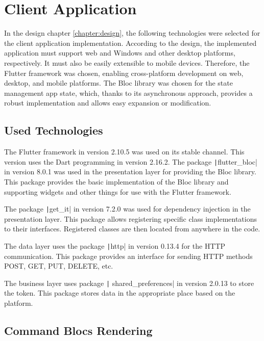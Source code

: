 \section{Client Application}

In the design chapter \ref{chapter:design}, the following technologies were selected for the client application implementation.
According to the design, the implemented application must support web and Windows and other desktop platforms, respectively.
It must also be easily extensible to mobile devices.
Therefore, the Flutter framework was chosen, enabling cross-platform development on web, desktop, and mobile platforms.
The Bloc library was chosen for the state management app state, which, thanks to its asynchronous approach, provides a robust implementation and allows easy expansion or modification.

\subsection{Used Technologies}

The Flutter framework in version 2.10.5 was used on its stable channel.
This version uses the Dart programming in version 2.16.2.
The package \texttt|flutter_bloc| in version 8.0.1 was used in the presentation layer for providing the Bloc library.
This package provides the basic implementation of the Bloc library and supporting widgets and other things for use with the Flutter framework.

The package \texttt|get_it| in version 7.2.0 was used for dependency injection in the presentation layer.
This package allows registering specific class implementations to their interfaces.
Registered classes are then located from anywhere in the code.

The data layer uses the package \texttt|http| in version 0.13.4 for the HTTP communication.
This package provides an interface for sending HTTP methods POST, GET, PUT, DELETE, etc.

The business layer uses package \texttt| shared_preferences| in version 2.0.13 to store the token.
This package stores data in the appropriate place based on the platform.

\subsection{Command Blocs Rendering}

